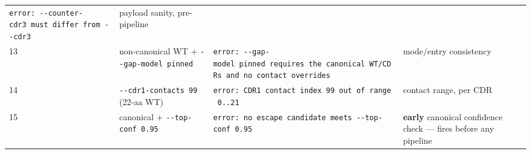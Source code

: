 \begin{longtable}[]{@{}llll@{}}
\begin{minipage}[t]{0.22\columnwidth}
\texttt{error:\ -\/-counter-cdr3\ must\ differ\ from\ -\/-cdr3}\strut
\end{minipage} & \begin{minipage}[t]{0.22\columnwidth}\raggedright
payload sanity, pre-pipeline\strut
\end{minipage}\tabularnewline
\begin{minipage}[t]{0.22\columnwidth}\raggedright
13\strut
\end{minipage} & \begin{minipage}[t]{0.22\columnwidth}\raggedright
non-canonical WT + \texttt{-\/-gap-model\ pinned}\strut
\end{minipage} & \begin{minipage}[t]{0.22\columnwidth}\raggedright
\texttt{error:\ -\/-gap-model\ pinned\ requires\ the\ canonical\ WT/CDRs\ and\ no\ contact\ overrides}\strut
\end{minipage} & \begin{minipage}[t]{0.22\columnwidth}\raggedright
mode/entry consistency\strut
\end{minipage}\tabularnewline
\begin{minipage}[t]{0.22\columnwidth}\raggedright
14\strut
\end{minipage} & \begin{minipage}[t]{0.22\columnwidth}\raggedright
\texttt{-\/-cdr1-contacts\ 99} (22-aa WT)\strut
\end{minipage} & \begin{minipage}[t]{0.22\columnwidth}\raggedright
\texttt{error:\ CDR1\ contact\ index\ 99\ out\ of\ range\ 0..21}\strut
\end{minipage} & \begin{minipage}[t]{0.22\columnwidth}\raggedright
contact range, per CDR\strut
\end{minipage}\tabularnewline
\begin{minipage}[t]{0.22\columnwidth}\raggedright
15\strut
\end{minipage} & \begin{minipage}[t]{0.22\columnwidth}\raggedright
canonical + \texttt{-\/-top-conf\ 0.95}\strut
\end{minipage} & \begin{minipage}[t]{0.22\columnwidth}\raggedright
\texttt{error:\ no\ escape\ candidate\ meets\ -\/-top-conf\ 0.95}\strut
\end{minipage} & \begin{minipage}[t]{0.22\columnwidth}\raggedright
\textbf{early} canonical confidence check --- fires before any pipeline

\end{minipage}
\end{longtable}
